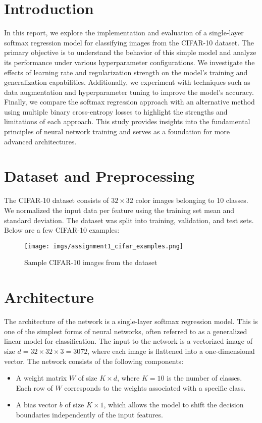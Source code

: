 \documentclass{article}
\begin{document}
\section{Introduction}
In this report, we explore the implementation and evaluation of a single-layer softmax regression model for classifying images from the CIFAR-10 dataset. The primary objective is to understand the behavior of this simple model and analyze its performance under various hyperparameter configurations. We investigate the effects of learning rate and regularization strength on the model's training and generalization capabilities. Additionally, we experiment with techniques such as data augmentation and hyperparameter tuning to improve the model's accuracy. Finally, we compare the softmax regression approach with an alternative method using multiple binary cross-entropy losses to highlight the strengths and limitations of each approach. This study provides insights into the fundamental principles of neural network training and serves as a foundation for more advanced architectures.

\section{Dataset and Preprocessing}
The CIFAR-10 dataset consists of $32\times32$ color images belonging to 10 classes. We normalized the input data per feature using the training set mean and standard deviation. The dataset was split into training, validation, and test sets. Below are a few CIFAR-10 examples:

\begin{figure}[h!]
    \centering
    \texttt{[image: imgs/assignment1\_cifar\_examples.png]}
    \caption{Sample CIFAR-10 images from the dataset}
\end{figure}
\section{Architecture}
The architecture of the network is a single-layer softmax regression model. This is one of the simplest forms of neural networks, often referred to as a generalized linear model for classification. The input to the network is a vectorized image of size $d = 32 \times 32 \times 3 = 3072$, where each image is flattened into a one-dimensional vector. The network consists of the following components:

\begin{itemize}
    \item A weight matrix $W$ of size $K \times d$, where $K=10$ is the number of classes. Each row of $W$ corresponds to the weights associated with a specific class.
    \item A bias vector $b$ of size $K \times 1$, which allows the model to shift the decision boundaries independently of the input features.
\end{itemize}
\end{document}

